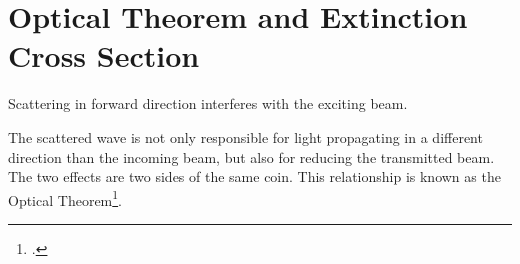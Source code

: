 \section{Optical Theorem and Extinction Cross Section}

\begin{marginfigure}
  \caption{Scattering in forward direction interferes with the exciting beam.}
\end{marginfigure}

The scattered wave is not only responsible for light propagating in a different direction than the incoming beam, but also for reducing the transmitted beam. The two effects are two sides of the same coin. This relationship is known as the Optical Theorem\footcite{Newton:1976cz}.


